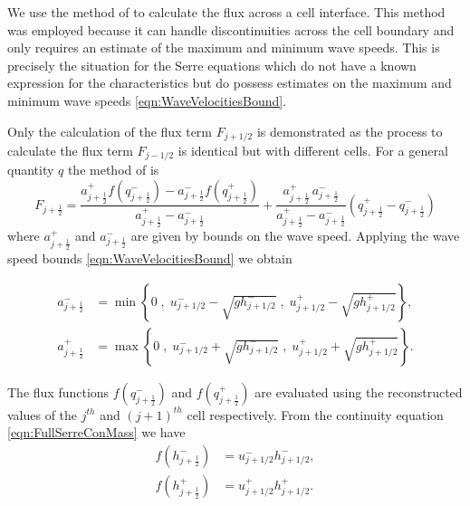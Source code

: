 We use the method of \citet{Kurganov-etal-2001-707} to calculate the flux across a cell interface. This method was employed because it can handle discontinuities across the cell boundary and only requires an estimate of the maximum and minimum wave speeds. This is precisely the situation for the Serre equations which do not have a known expression for the characteristics but do possess estimates on the maximum and minimum wave speeds \eqref{eqn:WaveVelocitiesBound}.

Only the calculation of the flux term $F_{j+1/2}$ is demonstrated as the process to calculate the flux term $F_{j-1/2}$ is identical but with different cells. For a general quantity $q$ the method of \citet{Kurganov-etal-2001-707} is
\begin{equation}\label{eqn:HLL_flux}
F_{j+\frac{1}{2}} = \dfrac{a^+_{j+\frac{1}{2}} f\left(q^-_{j+\frac{1}{2}}\right) - a^-_{j+\frac{1}{2}} f\left(q^+_{j+\frac{1}{2}}\right)}{a^+_{j+\frac{1}{2}} - a^-_{j+\frac{1}{2}}}  + \dfrac{a^+_{j+\frac{1}{2}} \, a^-_{j+\frac{1}{2}}}{a^+_{j+\frac{1}{2}} - a^-_{j+\frac{1}{2}}} \left(  q^+_{j+\frac{1}{2}} - q^-_{j+\frac{1}{2}} \right)
\end{equation}
where $a^+_{j+\frac{1}{2}}$ and $a^-_{j+\frac{1}{2}}$ are given by bounds on the wave speed. Applying the wave speed bounds \eqref{eqn:WaveVelocitiesBound} we obtain

\begin{align}
a^-_{j+\frac{1}{2}} &= \min\left\lbrace 0\;,\;  u^-_{j + 1/2} - \sqrt{g h^-_{j + 1/2}}  \;,\;u^+_{j + 1/2} - \sqrt{g h^+_{j + 1/2}} \right\rbrace  ,\\
a^+_{j+\frac{1}{2}} &= \max\left\lbrace 0 \;,\;  u^-_{j + 1/2} + \sqrt{g h^-_{j + 1/2}}  \;,\;u^+_{j + 1/2} + \sqrt{g h^+_{j + 1/2}} \right\rbrace .
\label{eqn:WaveSpeedBoundsFluxApprox}
\end{align}

The flux functions $f(q^-_{j+\frac{1}{2}})$ and $f(q^+_{j+\frac{1}{2}})$ are evaluated using the reconstructed values of the $j^{th}$ and $(j+1)^{th}$ cell respectively. From the continuity equation \eqref{eqn:FullSerreConMass} we have
\begin{align*}
f\left(h^-_{j+\frac{1}{2}}\right) &= u^-_{j + 1/2}  h^-_{j + 1/2}   ,\\
f\left(h^+_{j+\frac{1}{2}}\right) &= u^+_{j + 1/2}  h^+_{j + 1/2}  .
\end{align*}

